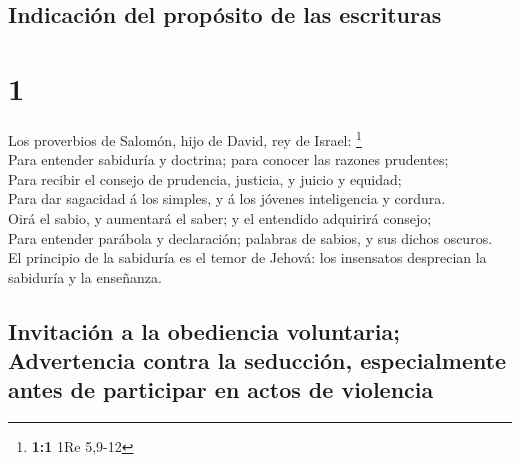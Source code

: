 \hypertarget{indicaciuxf3n-del-propuxf3sito-de-las-escrituras}{%
\subsection{Indicación del propósito de las
escrituras}\label{indicaciuxf3n-del-propuxf3sito-de-las-escrituras}}

\hypertarget{section}{%
\section{1}\label{section}}

 Los proverbios de Salomón, hijo de David, rey de Israel:
\footnote{\textbf{1:1} 1Re 5,9-12}\\
 Para entender sabiduría y doctrina; para conocer las
razones prudentes;\\
 Para recibir el consejo de prudencia, justicia, y juicio y
equidad;\\
 Para dar sagacidad á los simples, y á los jóvenes
inteligencia y cordura.\\
 Oirá el sabio, y aumentará el saber; y el entendido
adquirirá consejo;\\
 Para entender parábola y declaración; palabras de sabios, y
sus dichos oscuros.\\
 El principio de la sabiduría es el temor de Jehová: los
insensatos desprecian la sabiduría y la enseñanza.

\hypertarget{invitaciuxf3n-a-la-obediencia-voluntaria-advertencia-contra-la-seducciuxf3n-especialmente-antes-de-participar-en-actos-de-violencia}{%
\subsection{Invitación a la obediencia voluntaria; Advertencia contra la
seducción, especialmente antes de participar en actos de
violencia}\label{invitaciuxf3n-a-la-obediencia-voluntaria-advertencia-contra-la-seducciuxf3n-especialmente-antes-de-participar-en-actos-de-violencia}}

